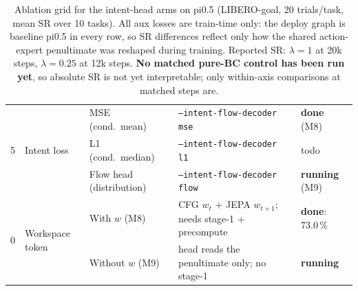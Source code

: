\begin{table}[t]
\begin{tabular}{@{}cllll@{}}
\multirow{3}{*}{5}
 & \multirow{3}{*}{Intent loss}
 & MSE (cond.\ mean)          & \texttt{--intent-flow-decoder mse}  & \textbf{done} (M8) \\
 & & L1 (cond.\ median)        & \texttt{--intent-flow-decoder l1}   & todo \\
 & & Flow head (distribution)  & \texttt{--intent-flow-decoder flow} & \textbf{running} (M9) \\
\midrule

\multirow{2}{*}{0}
 & \multirow{2}{*}{Workspace token}
 & With $w$ (M8)     & CFG $w_t$ $+$ JEPA $w_{t+1}$; needs stage-1 $+$ precompute & \textbf{done}: 73.0\,\% \\
 & & Without $w$ (M9) & head reads the penultimate only; no stage-1              & \textbf{running} \\

\bottomrule
\end{tabular}
\caption{Ablation grid for the intent-head arms on pi0.5 (LIBERO-goal, 20 trials/task,
mean SR over 10 tasks). All aux losses are train-time only: the deploy graph is baseline
pi0.5 in every row, so SR differences reflect only how the shared action-expert penultimate
was reshaped during training. Reported SR: $\lambda{=}1$ at 20k steps, $\lambda{=}0.25$ at
12k steps. \textbf{No matched pure-BC control has been run yet}, so absolute SR is not yet
interpretable; only within-axis comparisons at matched steps are.}
\label{tab:ablations}
\end{table}
